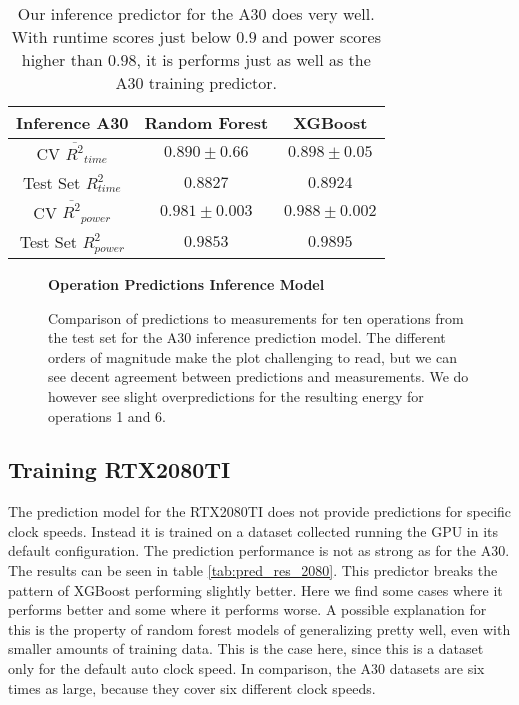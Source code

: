 \begin{table}[h!]
\centering
\begin{tabular}{|c|c|c|}
\hline
 \textbf{Inference A30}& \textbf{Random Forest} & \textbf{XGBoost} \\
\hline
CV $\overline{R^2}_{time}$ & $0.890 \pm 0.66$ &  $0.898 \pm 0.05$ \\
\hline
Test Set $R^2_{time}$ & $0.8827$ & $0.8924$ \\
\hline
CV $\overline{R^2}_{power}$ & $0.981 \pm 0.003$  &  $0.988 \pm 0.002$\\
\hline
Test Set $R^2_{power}$ & $0.9853$ & $0.9895$ \\
\hline
\end{tabular}
\caption{Our inference predictor for the A30 does very well. With runtime scores just below $0.9$ and power scores higher than $0.98$, it is performs just as well as the A30 training predictor. }
\label{tab:pred_res_inf}
\end{table}



\begin{figure}[htbp]
    \centering
    \parbox{1.1\textwidth}{\centering\textbf{Operation Predictions Inference Model}}
    \caption{Comparison of predictions to measurements for ten operations from the test set for the A30 inference prediction model. The different orders of magnitude make the plot challenging to read, but we can see decent agreement between predictions and measurements. We do however see slight overpredictions for the resulting energy for operations 1 and 6.}
    \label{fig:testsetops_inf}
\end{figure}


\subsection{Training RTX2080TI}

The prediction model for the RTX2080TI does not provide predictions for specific clock speeds. Instead it is trained on a dataset collected running the GPU in its default configuration. The prediction performance is not as strong as for the A30. The results can be seen in table \ref{tab:pred_res_2080}. This predictor breaks the pattern of XGBoost performing slightly better. Here we find some cases where it performs better and some where it performs worse. A possible explanation for this is the property of random forest models of generalizing pretty well, even with smaller amounts of training data. This is the case here, since this is a dataset only for the default auto clock speed. 
In comparison, the A30 datasets are six times as large, because they cover six different clock speeds.

